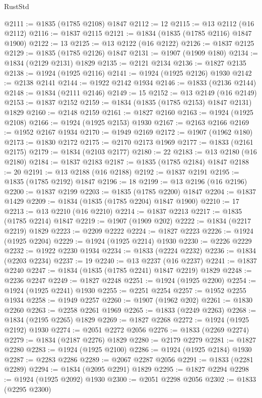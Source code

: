 \begin{lexlean}{RustStd}
\begin{coremodule}
{\begin{coremodule}
{{{{{@2111 := @1835 (@1785 @2108) @1847
@2112 := 12
@2115 := @13 @2112 (@16 @2112)
@2116 := @1837 @2115
@2121 := @1834 (@1835 (@1785 @2116) @1847 @1900)
@2122 := 13
@2125 := @13 @2122 (@16 @2122)
@2126 := @1837 @2125
@2129 := @1835 (@1785 @2126) @1847
@2131 := @1907 (@1909 @180)
@2134 := @1834 (@2129 @2131) @1829
@2135 := @2121 @2134
@2136 := @1827 @2135
@2138 := @1924 (@1925 @2116)
@2141 := @1924 (@1925 @2126) @1930
@2142 := @2138 @2141
@2144 := @1922 @2142 @1934
@2146 := @1833 (@2136 @2144)
@2148 := @1834 (@2111 @2146)
@2149 := 15
@2152 := @13 @2149 (@16 @2149)
@2153 := @1837 @2152
@2159 := @1834 (@1835 (@1785 @2153) @1847 @2131) @1829
@2160 := @2148 @2159
@2161 := @1827 @2160
@2163 := @1924 (@1925 @2108)
@2166 := @1924 (@1925 @2153) @1930
@2167 := @2163 @2166
@2169 := @1952 @2167 @1934
@2170 := @1949 @2169
@2172 := @1907 (@1962 @180)
@2173 := @1830 @2172
@2175 := @2170 @2173 @1969
@2177 := @1833 (@2161 @2175)
@2179 := @1834 (@2103 @2177)
@2180 := 22
@2183 := @13 @2180 (@16 @2180)
@2184 := @1837 @2183
@2187 := @1835 (@1785 @2184) @1847
@2188 := 20
@2191 := @13 @2188 (@16 @2188)
@2192 := @1837 @2191
@2195 := @1835 (@1785 @2192) @1847
@2196 := 18
@2199 := @13 @2196 (@16 @2196)
@2200 := @1837 @2199
@2203 := @1835 (@1785 @2200) @1847
@2204 := @1837 @1429
@2209 := @1834 (@1835 (@1785 @2204) @1847 @1900)
@2210 := 17
@2213 := @13 @2210 (@16 @2210)
@2214 := @1837 @2213
@2217 := @1835 (@1785 @2214) @1847
@2219 := @1907 (@1909 @202)
@2222 := @1834 (@2217 @2219) @1829
@2223 := @2209 @2222
@2224 := @1827 @2223
@2226 := @1924 (@1925 @2204)
@2229 := @1924 (@1925 @2214) @1930
@2230 := @2226 @2229
@2232 := @1922 @2230 @1934
@2234 := @1833 (@2224 @2232)
@2236 := @1834 (@2203 @2234)
@2237 := 19
@2240 := @13 @2237 (@16 @2237)
@2241 := @1837 @2240
@2247 := @1834 (@1835 (@1785 @2241) @1847 @2219) @1829
@2248 := @2236 @2247
@2249 := @1827 @2248
@2251 := @1924 (@1925 @2200)
@2254 := @1924 (@1925 @2241) @1930
@2255 := @2251 @2254
@2257 := @1952 @2255 @1934
@2258 := @1949 @2257
@2260 := @1907 (@1962 @202)
@2261 := @1830 @2260
@2263 := @2258 @2261 @1969
@2265 := @1833 (@2249 @2263)
@2268 := @1834 (@2195 @2265) @1829
@2269 := @1827 @2268
@2272 := @1924 (@1925 @2192) @1930
@2274 := @2051 @2272 @2056
@2276 := @1833 (@2269 @2274)
@2279 := @1834 (@2187 @2276) @1829
@2280 := @2179 @2279
@2281 := @1827 @2280
@2283 := @1924 (@1925 @2100)
@2286 := @1924 (@1925 @2184) @1930
@2287 := @2283 @2286
@2289 := @2067 @2287 @2056
@2291 := @1833 (@2281 @2289)
@2294 := @1834 (@2095 @2291) @1829
@2295 := @1827 @2294
@2298 := @1924 (@1925 @2092) @1930
@2300 := @2051 @2298 @2056
@2302 := @1833 (@2295 @2300)
}}}}}
\end{coremodule}}
\end{coremodule}
\end{lexlean}
